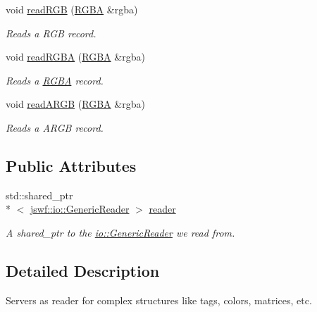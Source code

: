 \begin{DoxyCompactItemize}
void \hyperlink{classjswf_1_1flash_1_1_reader_abba53a3337f589e3641681c2251e4d8d}{read\+R\+G\+B} (\hyperlink{structjswf_1_1flash_1_1_r_g_b_a}{R\+G\+B\+A} \&rgba)
\begin{DoxyCompactList}\small\item\em Reads a {\ttfamily R\+G\+B} record. \end{DoxyCompactList}\item 
void \hyperlink{classjswf_1_1flash_1_1_reader_a2c89e5f540d698d4d4fc4dc983dcf81c}{read\+R\+G\+B\+A} (\hyperlink{structjswf_1_1flash_1_1_r_g_b_a}{R\+G\+B\+A} \&rgba)
\begin{DoxyCompactList}\small\item\em Reads a {\ttfamily \hyperlink{structjswf_1_1flash_1_1_r_g_b_a}{R\+G\+B\+A}} record. \end{DoxyCompactList}\item 
void \hyperlink{classjswf_1_1flash_1_1_reader_a24336182f01a3250950dd5b6c20d0b11}{read\+A\+R\+G\+B} (\hyperlink{structjswf_1_1flash_1_1_r_g_b_a}{R\+G\+B\+A} \&rgba)
\begin{DoxyCompactList}\small\item\em Reads a {\ttfamily A\+R\+G\+B} record. \end{DoxyCompactList}\end{DoxyCompactItemize}
\subsection*{Public Attributes}
\begin{DoxyCompactItemize}
\item 
\hypertarget{classjswf_1_1flash_1_1_reader_a3068a74af985abeea11ac36673e7fcbd}{std\+::shared\+\_\+ptr\\*
$<$ \hyperlink{classjswf_1_1io_1_1_generic_reader}{jswf\+::io\+::\+Generic\+Reader} $>$ \hyperlink{classjswf_1_1flash_1_1_reader_a3068a74af985abeea11ac36673e7fcbd}{reader}}\label{classjswf_1_1flash_1_1_reader_a3068a74af985abeea11ac36673e7fcbd}

\begin{DoxyCompactList}\small\item\em A {\ttfamily shared\+\_\+ptr} to the \hyperlink{classjswf_1_1io_1_1_generic_reader}{io\+::\+Generic\+Reader} we read from. \end{DoxyCompactList}\end{DoxyCompactItemize}


\subsection{Detailed Description}
Servers as reader for complex structures like tags, colors, matrices, etc. 

